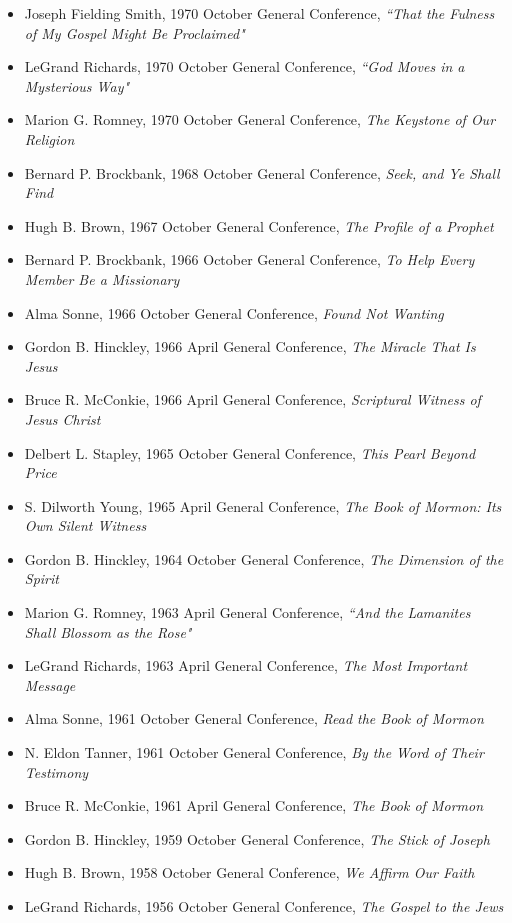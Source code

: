 \documentclass[12pt]{report}
\begin{document}
\begin{itemize}
\item Joseph Fielding Smith, 1970 October General Conference, \emph{``That the Fulness of My Gospel Might Be Proclaimed"}
\item LeGrand Richards, 1970 October General Conference, \emph{``God Moves in a Mysterious Way"}
\item Marion G. Romney, 1970 October General Conference, \emph{The Keystone of Our Religion}
\item Bernard P. Brockbank, 1968 October General Conference, \emph{Seek, and Ye Shall Find}
\item Hugh B. Brown, 1967 October General Conference, \emph{The Profile of a Prophet}
\item Bernard P. Brockbank, 1966 October General Conference, \emph{To Help Every Member Be a Missionary}
\item Alma Sonne, 1966 October General Conference, \emph{Found Not Wanting}
\item Gordon B. Hinckley, 1966 April General Conference, \emph{The Miracle That Is Jesus}
\item Bruce R. McConkie, 1966 April General Conference, \emph{Scriptural Witness of Jesus Christ}
\item Delbert L. Stapley, 1965 October General Conference, \emph{This Pearl Beyond Price}
\item S. Dilworth Young, 1965 April General Conference, \emph{The Book of Mormon: Its Own Silent Witness}
\item Gordon B. Hinckley, 1964 October General Conference, \emph{The Dimension of the Spirit}
\item Marion G. Romney, 1963 April General Conference, \emph{``And the Lamanites Shall Blossom as the Rose"}
\item LeGrand Richards, 1963 April General Conference, \emph{The Most Important Message}
\item Alma Sonne, 1961 October General Conference, \emph{Read the Book of Mormon}
\item N. Eldon Tanner, 1961 October General Conference, \emph{By the Word of Their Testimony}
\item Bruce R. McConkie, 1961 April General Conference, \emph{The Book of Mormon}
\item Gordon B. Hinckley, 1959 October General Conference, \emph{The Stick of Joseph}
\item Hugh B. Brown, 1958 October General Conference, \emph{We Affirm Our Faith}
\item LeGrand Richards, 1956 October General Conference, \emph{The Gospel to the Jews}

\end{itemize}
\end{document}
